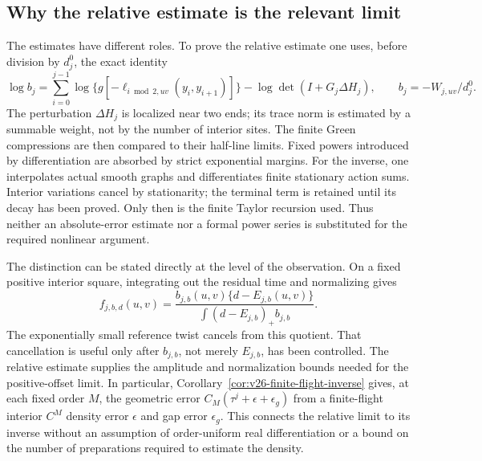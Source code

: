 \subsection{Why the relative estimate is the relevant limit}

The estimates have different roles.  To prove the relative estimate one
uses, before division by $d_j^0$, the exact identity
\begin{equation}\label{eq:v56-normalized-determinant}
 \log b_j=\sum_{i=0}^{j-1}
 \log\{g[-\ell_{i\bmod2,uv}(y_i,y_{i+1})]\}
                         -\log\det(I+G_j\Delta H_j),
 \qquad b_j=-W_{j,uv}/d_j^0.
\end{equation}
The perturbation $\Delta H_j$ is localized near two ends; its trace norm
is estimated by a summable weight, not by the number of interior sites.
The finite Green compressions are then compared to their half-line
limits.  Fixed powers introduced by differentiation are absorbed by
strict exponential margins.  For the inverse, one interpolates actual
smooth graphs and differentiates finite stationary action sums.  Interior
variations cancel by stationarity; the terminal term is retained until
its decay has been proved.  Only then is the finite Taylor recursion
used.  Thus neither an absolute-error estimate nor a formal power series
is substituted for the required nonlinear argument.

The distinction can be stated directly at the level of the observation.
On a fixed positive interior square, integrating out the residual time
and normalizing gives
\[
 f_{j,b,d}(u,v)=
 \frac{b_{j,b}(u,v)\{d-E_{j,b}(u,v)\}}
 {\int (d-E_{j,b})_+b_{j,b}}.
\]
The exponentially small reference twist cancels from this quotient.
That cancellation is useful only after $b_{j,b}$, not merely $E_{j,b}$,
has been controlled.  The relative estimate supplies the amplitude and
normalization bounds needed for the positive-offset limit.  In particular,
Corollary~\ref{cor:v26-finite-flight-inverse} gives, at each fixed order
$M$, the geometric error $C_M(\tau^j+\epsilon+\epsilon_g)$ from a
finite-flight interior $C^M$ density error $\epsilon$ and gap error
$\epsilon_g$.  This connects the relative limit to its inverse without
an assumption of order-uniform real differentiation or a bound on the
number of preparations required to estimate the density.

